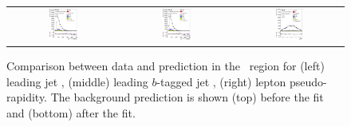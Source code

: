\begin{figure}[tp]
\begin{tabular}{ccc}
  \includegraphics[width=0.27\textwidth]{Analysis/Figures_ttH/tesis_vars/postfit/jet1_pt_5jetex2btagex.eps} &
  \includegraphics[width=0.27\textwidth]{Analysis/Figures_ttH/tesis_vars/postfit/bjet1_pt_5jetex2btagex.eps} &
  \includegraphics[width=0.27\textwidth]{Analysis/Figures_ttH/tesis_vars/postfit/lep_eta_5jetex2btagex.eps} \\
\end{tabular}
\caption{Comparison between data and prediction in the \fivetwo\ region for (left) leading jet \pt, (middle) leading $b$-tagged jet \pt, (right) lepton pseudo-rapidity. The background prediction is shown (top) before the fit and (bottom) after the fit.}
  \label{fig:vars2_fivetwo}
\end{figure}


